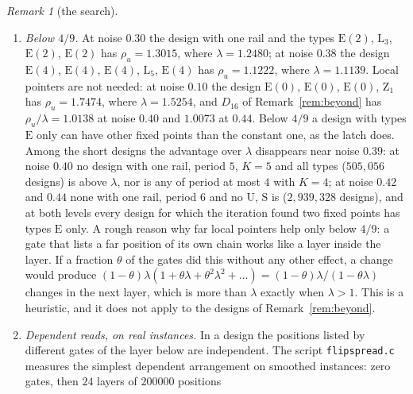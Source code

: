 \documentclass[11pt]{amsart}
\theoremstyle{definition}
\theoremstyle{remark}
\newtheorem{remark}[theorem]{Remark}
\begin{document}
\begin{remark}[the search]
\begin{enumerate}[label=(\roman*),leftmargin=2.4em]
$0.96671$, $0.96961$ and $0.96912$ ($\mathrm L_2,\dots,\mathrm L_8$). With period $64$ the loss
is about half as large. Among the designs of period $8$, $16$, $32$ and $64$ in which a block of at
most three gates has arbitrary types ($\mathrm E$ of one of up to five phases, $\mathrm Z_0$,
$\mathrm Z_1$, $\mathrm L_1,\dots,\mathrm L_4$) and all other gates have type $\mathrm U$, none is
above $0.97190$. In a background of type $\mathrm U$ a rare change does not help; in a background
of types $\mathrm E(c)$ it does (Remark~\ref{rem:beyond}).
\item \emph{Below $4/9$.} At noise $0.30$ the design with one rail and the types $\mathrm E(2)$,
$\mathrm L_3$, $\mathrm E(2)$, $\mathrm E(2)$ has $\rho_u=1.3015$, where $\lambda=1.2480$; at
noise $0.38$ the design $\mathrm E(4)$, $\mathrm E(4)$, $\mathrm E(4)$, $\mathrm L_5$,
$\mathrm E(4)$ has $\rho_u=1.1222$, where $\lambda=1.1139$. Local pointers are not needed: at
noise $0.10$ the design $\mathrm E(0)$, $\mathrm E(0)$, $\mathrm E(0)$, $\mathrm Z_1$ has
$\rho_u=1.7474$, where $\lambda=1.5254$, and $D_{16}$ of Remark~\ref{rem:beyond} has
$\rho_u/\lambda=1.0138$ at noise $0.40$ and $1.0073$ at $0.44$. Below $4/9$ a design with types
$\mathrm E$ only can have other fixed points than the constant one, as the latch does. Among the
short designs the advantage over $\lambda$ disappears near noise $0.39$: at noise $0.40$ no design
with one rail, period $5$, $K=5$ and all types ($505{,}056$ designs) is above $\lambda$, nor is any
of period at most $4$ with $K=4$; at noise $0.42$ and $0.44$ none with one rail, period $6$ and no
$\mathrm U$, $\mathrm S$ is ($2{,}939{,}328$ designs), and at both levels every design for which
the iteration found two fixed points has types $\mathrm E$ only. A rough reason why far local
pointers help only below $4/9$: a gate that lists a far position of its own chain works like a
layer inside the layer. If a fraction $\theta$ of the gates did this without any other effect, a
change would produce
$(1-\theta)\lambda(1+\theta\lambda+\theta^2\lambda^2+\dots)=(1-\theta)\lambda/(1-\theta\lambda)$
changes in the next layer, which is more than $\lambda$ exactly when $\lambda>1$. This is a
heuristic, and it does not apply to the designs of Remark~\ref{rem:beyond}.
\item \emph{Dependent reads, on real instances.} In a design the positions listed by different
gates of the layer below are independent. The script \texttt{flipspread.c} measures the simplest
dependent arrangement on smoothed instances: zero gates, then $24$ layers of $200000$ positions

\end{enumerate}
\end{remark}
\end{document}
